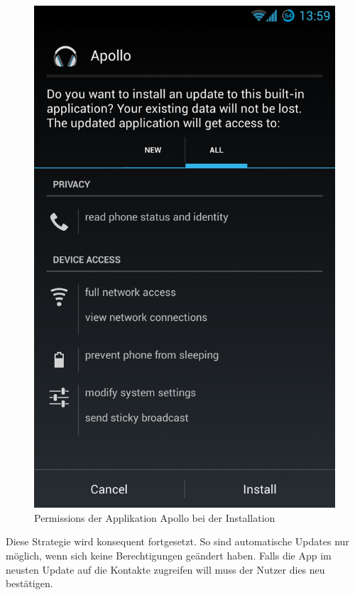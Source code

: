 \begin{figure}[ht!]
\begin{center}
\includegraphics[scale=0.3]{images/permissions}
\caption{Permissions der Applikation Apollo bei der Installation}
\label{permissions}
\end{center}
\end{figure}

Diese Strategie wird konsequent fortgesetzt. So sind automatische Updates nur möglich, wenn sich keine Berechtigungen geändert haben. Falls die App im neusten Update auf die Kontakte zugreifen will muss der Nutzer dies neu bestätigen.

